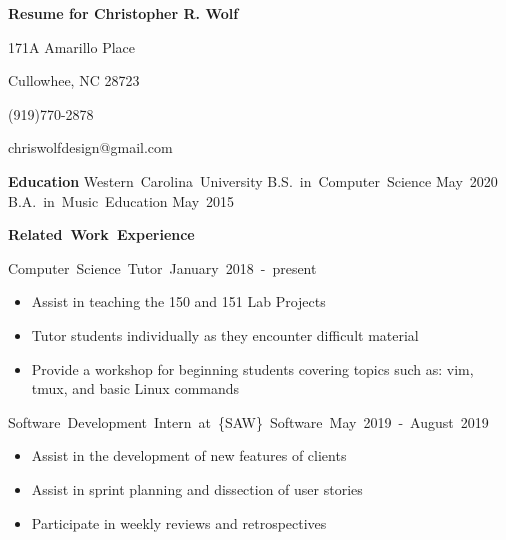 \documentclass[12pt]{letter}
\begin{document}
    \thispagestyle{empty} %

    \centerline{\textbf{\large Resume for Christopher R. Wolf}}
    \centerline{171A Amarillo Place}
    \centerline{Cullowhee, NC 28723}
    \centerline{(919)770-2878}
    \centerline{chriswolfdesign@gmail.com}

    \vspace{10 mm}
    \textbf{\large Education}
    \vspace{3 mm}
    \hbox{Western Carolina University}
    \linebreak
    \hbox{B.S. in Computer Science} \hspace{200pt} \hbox{May 2020}
    \linebreak
    \hbox{B.A. in Music Education} \hspace{245pt} \hbox{May 2015}

    \vspace {10 mm}
    \hbox{\textbf{\large {Related Work Experience}}}
    \vspace{3 mm}

    \hbox{Computer Science Tutor \hspace{185pt} January 2018 - present}
    \vspace{-5 mm}
    \begin{itemize}
        \itemsep 0em
        \item Assist in teaching the 150 and 151 Lab Projects
        \item Tutor students individually as they encounter difficult material
        \item Provide a workshop for beginning students covering topics such 
            as: vim, tmux, and basic Linux commands
    \end{itemize}

    \vspace{2 mm}
    \hbox{Software Development Intern at \{SAW\} Software \hspace{50pt}
        May 2019 - August 2019}
    \vspace{-5 mm}
    \begin{itemize}
        \itemsep 0em
        \item Assist in the development of new features of clients
        \item Assist in sprint planning and dissection of user stories
        \item Participate in weekly reviews and retrospectives
    \end{itemize}
\end{document}
